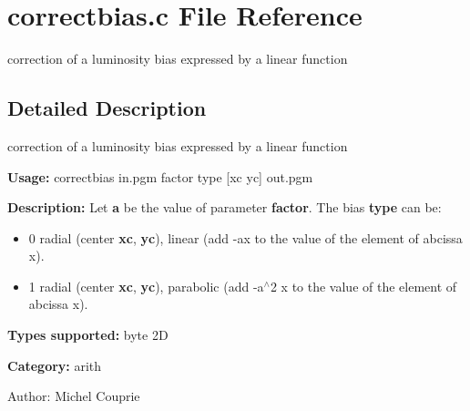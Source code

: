 \section{correctbias.c File Reference}
\label{correctbias_8c}
correction of a luminosity bias expressed by a linear function 



\subsection{Detailed Description}
correction of a luminosity bias expressed by a linear function 

{\bf Usage:} correctbias in.pgm factor type [xc yc] out.pgm

{\bf Description:} Let {\bf a} be the value of parameter {\bf factor}. The bias {\bf type} can be: \begin{itemize}
\item 0 radial (center {\bf xc}, {\bf yc}), linear (add -ax to the value of the element of abcissa x). \item 1 radial (center {\bf xc}, {\bf yc}), parabolic (add -a$^\wedge$2 x to the value of the element of abcissa x).\end{itemize}
{\bf Types supported:} byte 2D

{\bf Category:} arith

\begin{Desc}
\item[Author:]Michel Couprie \end{Desc}
